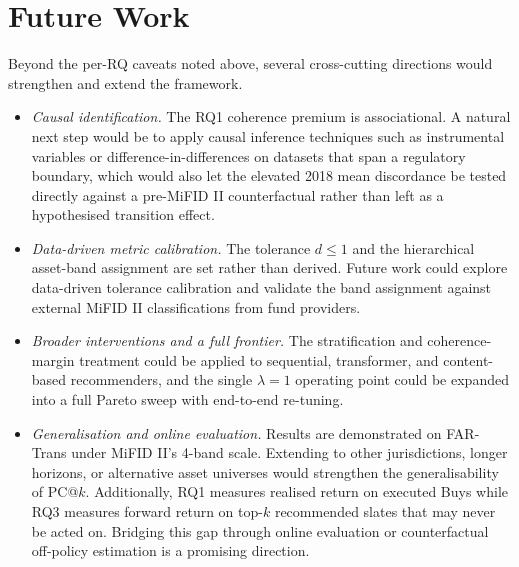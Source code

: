 \section{Future Work}
\label{sec:futurework}

Beyond the per-RQ caveats noted above, several cross-cutting directions would strengthen and extend the framework.

\begin{itemize}
    \item \textit{Causal identification.} The RQ1 coherence premium is associational. A natural next step would be to apply causal inference techniques such as instrumental variables or difference-in-differences on datasets that span a regulatory boundary, which would also let the elevated 2018 mean discordance be tested directly against a pre-MiFID II counterfactual rather than left as a hypothesised transition effect.
    \item \textit{Data-driven metric calibration.} The tolerance $d \leq 1$ and the hierarchical asset-band assignment are set rather than derived. Future work could explore data-driven tolerance calibration and validate the band assignment against external MiFID II classifications from fund providers.
    \item \textit{Broader interventions and a full frontier.} The stratification and coherence-margin treatment could be applied to sequential, transformer, and content-based recommenders, and the single $\lambda = 1$ operating point could be expanded into a full Pareto sweep with end-to-end re-tuning.
    \item \textit{Generalisation and online evaluation.} Results are demonstrated on FAR-Trans under MiFID II's 4-band scale. Extending to other jurisdictions, longer horizons, or alternative asset universes would strengthen the generalisability of PC@$k$. Additionally, RQ1 measures realised return on executed Buys while RQ3 measures forward return on top-$k$ recommended slates that may never be acted on. Bridging this gap through online evaluation or counterfactual off-policy estimation is a promising direction.
\end{itemize}
